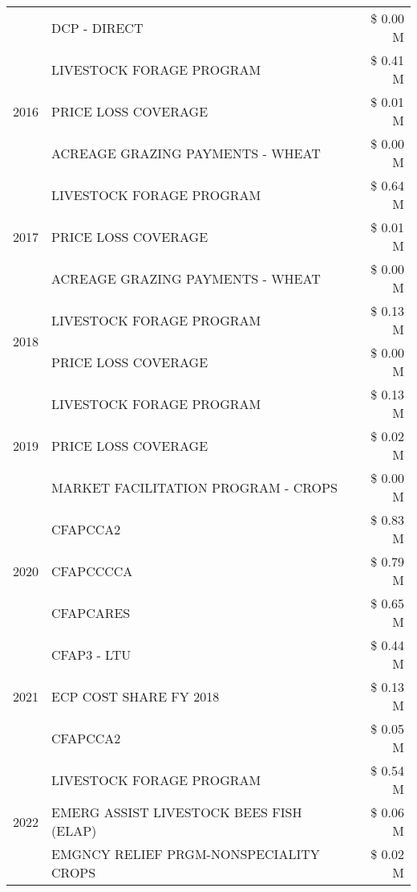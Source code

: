 \begin{tabular}{llr}
 & DCP - DIRECT & \$ 0.00 M \\
\cline{1-3}
\multirow[t]{3}{*}{2016} & LIVESTOCK FORAGE PROGRAM & \$ 0.41 M \\
 & PRICE LOSS COVERAGE & \$ 0.01 M \\
 & ACREAGE GRAZING PAYMENTS - WHEAT & \$ 0.00 M \\
\cline{1-3}
\multirow[t]{3}{*}{2017} & LIVESTOCK FORAGE PROGRAM & \$ 0.64 M \\
 & PRICE LOSS COVERAGE & \$ 0.01 M \\
 & ACREAGE GRAZING PAYMENTS - WHEAT & \$ 0.00 M \\
\cline{1-3}
\multirow[t]{2}{*}{2018} & LIVESTOCK FORAGE PROGRAM & \$ 0.13 M \\
 & PRICE LOSS COVERAGE & \$ 0.00 M \\
\cline{1-3}
\multirow[t]{3}{*}{2019} & LIVESTOCK FORAGE PROGRAM & \$ 0.13 M \\
 & PRICE LOSS COVERAGE & \$ 0.02 M \\
 & MARKET FACILITATION PROGRAM - CROPS & \$ 0.00 M \\
\cline{1-3}
\multirow[t]{3}{*}{2020} & CFAPCCA2 & \$ 0.83 M \\
 & CFAPCCCCA & \$ 0.79 M \\
 & CFAPCARES & \$ 0.65 M \\
\cline{1-3}
\multirow[t]{3}{*}{2021} & CFAP3 - LTU & \$ 0.44 M \\
 & ECP COST SHARE FY 2018 & \$ 0.13 M \\
 & CFAPCCA2 & \$ 0.05 M \\
\cline{1-3}
\multirow[t]{3}{*}{2022} & LIVESTOCK FORAGE PROGRAM & \$ 0.54 M \\
 & EMERG ASSIST LIVESTOCK BEES FISH (ELAP) & \$ 0.06 M \\
 & EMGNCY RELIEF PRGM-NONSPECIALITY CROPS & \$ 0.02 M \\
\cline{1-3}
\bottomrule
\end{tabular}
